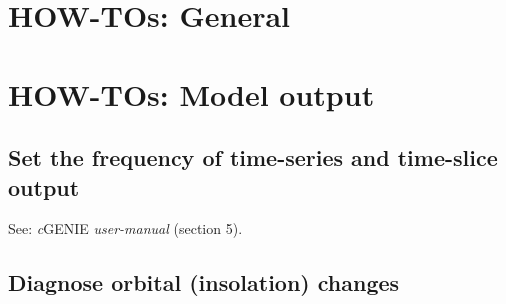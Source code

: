 \documentclass[10pt,twoside]{article}
\begin{document}

\newpage
\section{HOW-TOs: General}\label{how-to-1}




\newpage
\section{HOW-TOs: Model output}\label{how-to-2}


\subsection{Set the frequency of time-series and time-slice output}\label{how-to-2a}

See: \textit{c}GENIE \textit{user-manual} (section 5).


\subsection{Diagnose orbital (insolation) changes}\label{how-to-2b}
\end{document}
